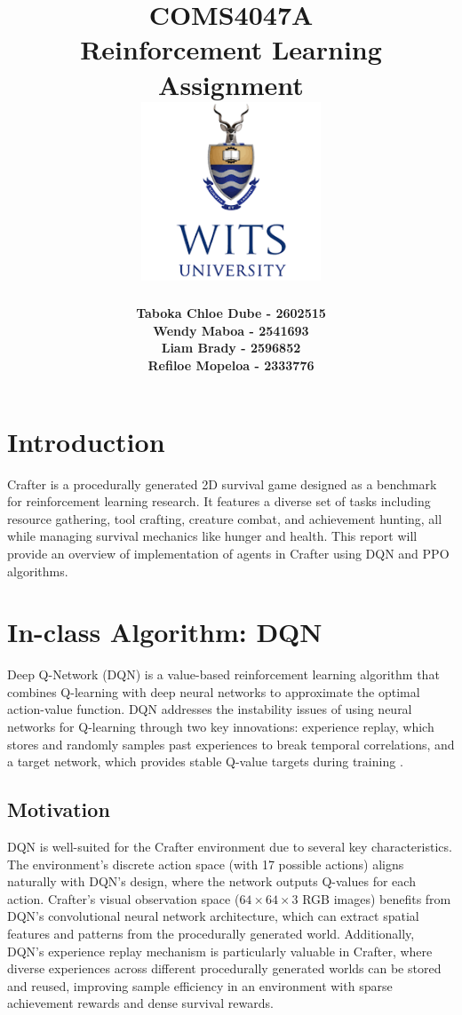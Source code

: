 \documentclass[twocolumn]{article}
\title{
    \textbf{\small COMS4047A}\\[0.5em]
    \textbf{Reinforcement Learning}\\[1em]
    {\Huge \textbf{Assignment}}\\[3cm]
    \includegraphics[width=0.4\textwidth]{download.png}
}
\author{
    \small
    \begin{tabular}{l}
    \textbf{Taboka Chloe Dube - 2602515} \\
    \textbf{Wendy Maboa - 2541693} \\
    \textbf{Liam Brady - 2596852} \\
    \textbf{Refiloe Mopeloa - 2333776}
    \end{tabular}
}
\begin{document}
\begin{titlepage}  %
    \maketitle
\end{titlepage}


\newpage

\setcounter{page}{1}
\section*{Introduction}
Crafter is a procedurally generated 2D survival game designed as a benchmark for reinforcement learning
 research. It features a diverse set of tasks including resource gathering, tool crafting, creature combat, and
 achievement hunting, all while managing survival mechanics like hunger and health. This report will provide an overview of implementation of agents in Crafter using DQN and PPO algorithms.

\section*{In-class Algorithm: DQN}

Deep Q-Network (DQN) is a value-based reinforcement learning algorithm that combines Q-learning with deep neural networks to approximate the optimal action-value function. DQN addresses the instability issues of using neural networks for Q-learning through two key innovations: experience replay, which stores and randomly samples past experiences to break temporal correlations, and a target network, which provides stable Q-value targets during training \parencite{mnih2015human}.

\subsection*{Motivation}
DQN is well-suited for the Crafter environment due to several key characteristics. The environment's discrete action space (with 17 possible actions) aligns naturally with DQN's design, where the network outputs Q-values for each action. Crafter's visual observation space ($64 \times 64 \times 3$ RGB images) benefits from DQN's convolutional neural network architecture, which can extract spatial features and patterns from the procedurally generated world. Additionally, DQN's experience replay mechanism is particularly valuable in Crafter, where diverse experiences across different procedurally generated worlds can be stored and reused, improving sample efficiency in an environment with sparse achievement rewards and dense survival rewards.
\end{document}
